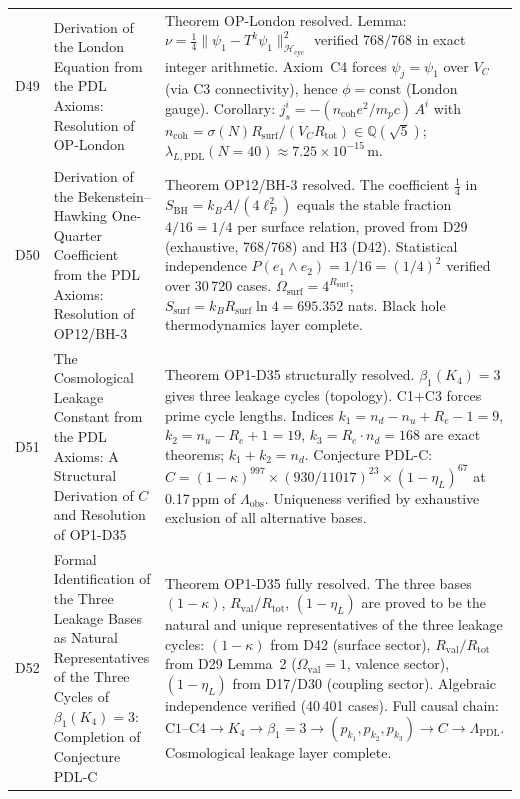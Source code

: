 \documentclass[11pt,a4paper]{article}
\newcommand{\Rval}{R_{\mathrm{val}}}
\theoremstyle{plain}
\theoremstyle{definition}
\theoremstyle{remark}
\newcommand{\Rsurf}{R_{\mathrm{surf}}}
\newcommand{\Rtot}{R_{\mathrm{tot}}}
\newcommand{\SBH}{S_{\mathrm{BH}}}
\begin{document}
\begin{longtable}{L{1.3cm}L{3.8cm}L{8.0cm}}
D49 & Derivation of the London Equation from the PDL Axioms: Resolution of OP-London~\cite{D49} & \textcolor{proofblue}{Theorem} OP-London resolved. Lemma: $\nu = \tfrac{1}{4}\|\psi_1 - T^k\psi_1\|^2_{\mathcal{H}_{\mathrm{cyc}}}$ verified 768/768 in exact integer arithmetic. Axiom~C4 forces $\psi_j = \psi_1$ over $V_C$ (via C3 connectivity), hence $\phi = \mathrm{const}$ (London gauge). Corollary: $j^i_s = -(n_{\mathrm{coh}} e^2 / m_p c)\,A^i$ with $n_{\mathrm{coh}} = \sigma(N)\Rsurf/(V_C\Rtot) \in \mathbb{Q}(\sqrt{5})$; $\lambda_{L,\mathrm{PDL}}(N=40) \approx 7.25 \times 10^{-15}$\,m.\\[0.4em]
D50 & Derivation of the Bekenstein--Hawking One-Quarter Coefficient from the PDL Axioms: Resolution of OP12/BH-3~\cite{D50} & \textcolor{proofblue}{Theorem} OP12/BH-3 resolved. The coefficient $\tfrac{1}{4}$ in $\SBH = k_B A/(4\ell_P^2)$ equals the stable fraction $4/16 = 1/4$ per surface relation, proved from D29 (exhaustive, 768/768) and H3 (D42). Statistical independence $P(e_1\wedge e_2) = 1/16 = (1/4)^2$ verified over 30\,720 cases. $\Omega_{\mathrm{surf}} = 4^{\Rsurf}$; $S_{\mathrm{surf}} = k_B\Rsurf\ln 4 = 695.352$ nats. Black hole thermodynamics layer complete.\\[0.4em]
D51 & The Cosmological Leakage Constant from the PDL Axioms: A Structural Derivation of $C$ and Resolution of OP1-D35~\cite{D51} & \textcolor{proofblue}{Theorem} OP1-D35 structurally resolved. $\beta_1(K_4)=3$ gives three leakage cycles (topology). C1+C3 forces prime cycle lengths. Indices $k_1 = n_d - n_u + R_e - 1 = 9$, $k_2 = n_u - R_e + 1 = 19$, $k_3 = R_e \cdot n_d = 168$ are exact theorems; $k_1+k_2=n_d$. Conjecture PDL-C: $C = (1-\kappa)^{997} \times (930/11017)^{23} \times (1-\eta_L)^{67}$ at 0.17\,ppm of $\Lambda_{\mathrm{obs}}$. Uniqueness verified by exhaustive exclusion of all alternative bases.\\[0.4em]
D52 & Formal Identification of the Three Leakage Bases as Natural Representatives of the Three Cycles of $\beta_1(K_4)=3$: Completion of Conjecture PDL-C~\cite{D52} & \textcolor{proofblue}{Theorem} OP1-D35 fully resolved. The three bases $(1-\kappa)$, $\Rval/\Rtot$, $(1-\eta_L)$ are proved to be the natural and unique representatives of the three leakage cycles: $(1-\kappa)$ from D42 (surface sector), $\Rval/\Rtot$ from D29 Lemma~2 ($\Omega_{\mathrm{val}}=1$, valence sector), $(1-\eta_L)$ from D17/D30 (coupling sector). Algebraic independence verified (40\,401 cases). Full causal chain: $\mathrm{C1}\text{--}\mathrm{C4} \to K_4 \to \beta_1=3 \to (p_{k_1},p_{k_2},p_{k_3}) \to C \to \Lambda_{\mathrm{PDL}}$. Cosmological leakage layer complete.\\[0.4em]

\end{longtable}
\end{document}
